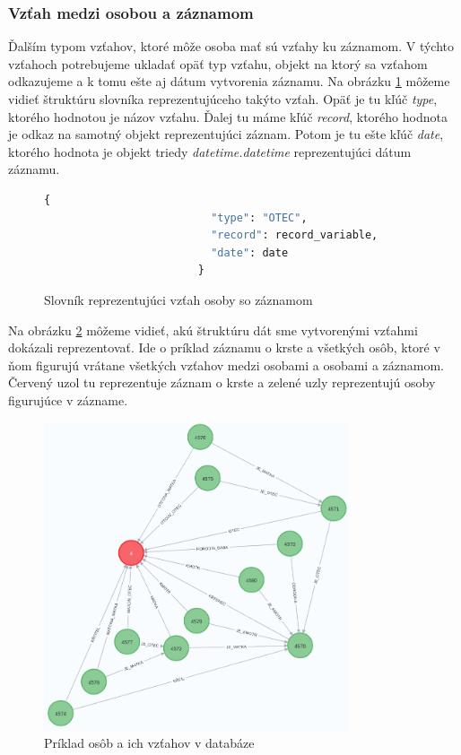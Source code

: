 \subsubsection{Vzťah medzi osobou a záznamom}

Ďalším typom vzťahov, ktoré môže osoba mať sú vzťahy ku záznamom. V týchto vzťahoch potrebujeme ukladať opäť typ vzťahu, objekt na ktorý sa vzťahom odkazujeme a k tomu ešte aj dátum vytvorenia záznamu. Na obrázku \ref{relationship-record} môžeme vidieť štruktúru slovníka reprezentujúceho takýto vzťah. Opäť je tu kľúč \textit{type}, ktorého hodnotou je názov vzťahu. Ďalej tu máme kľúč \textit{record}, ktorého hodnota je odkaz na samotný objekt reprezentujúci záznam. Potom je tu ešte kľúč \textit{date}, ktorého hodnota je objekt triedy \textit{datetime.datetime} reprezentujúci dátum záznamu.

\begin{figure}[H]
    \centering
    \begin{lstlisting}[language=python]
                        {
                          "type": "OTEC",
                          "record": record_variable,
                          "date": date
                        }              
    \end{lstlisting}
    \caption{Slovník reprezentujúci vzťah osoby so záznamom}
    \label{relationship-record}
\end{figure}
\pagebreak

Na obrázku \ref{people} môžeme vidieť, akú štruktúru dát sme vytvorenými vzťahmi dokázali reprezentovať. Ide o príklad záznamu o krste a všetkých osôb, ktoré v ňom figurujú vrátane všetkých vzťahov medzi osobami a osobami a záznamom. Červený uzol tu reprezentuje záznam o krste a zelené uzly reprezentujú osoby figurujúce v zázname.

\begin{figure}[H]
    \centering
    \includegraphics[width=0.8\textwidth]{obrazky-figures/people.png}
    \caption{Príklad osôb a ich vzťahov v databáze}
    \label{people}
\end{figure}

